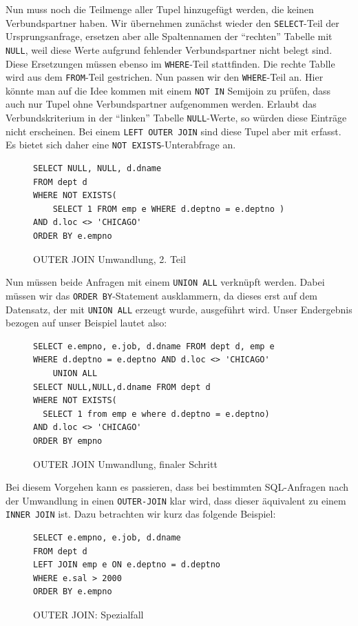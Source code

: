 Nun muss noch die Teilmenge aller Tupel hinzugefügt werden, die keinen Verbundspartner haben. Wir übernehmen zunächst wieder den \verb|SELECT|-Teil der Ursprungsanfrage, ersetzen aber alle Spaltennamen der ``rechten'' Tabelle mit \verb|NULL|, weil diese Werte aufgrund fehlender Verbundspartner nicht belegt sind. Diese Ersetzungen müssen ebenso im \verb|WHERE|-Teil stattfinden. Die rechte Tablle wird aus dem \verb|FROM|-Teil gestrichen. Nun passen wir den \verb|WHERE|-Teil an. Hier könnte man auf die Idee kommen mit einem \verb|NOT IN| Semijoin zu prüfen, dass auch nur Tupel ohne Verbundspartner aufgenommen werden. Erlaubt  das Verbundskriterium in der ``linken'' Tabelle \verb|NULL|-Werte, so würden diese Einträge nicht erscheinen. Bei einem \verb|LEFT OUTER JOIN| sind diese Tupel aber mit erfasst. Es bietet sich daher eine \verb|NOT EXISTS|-Unterabfrage an. 

\begin{figure}[h]
\begin{verbatim}
SELECT NULL, NULL, d.dname
FROM dept d 
WHERE NOT EXISTS(
    SELECT 1 FROM emp e WHERE d.deptno = e.deptno )
AND d.loc <> 'CHICAGO'
ORDER BY e.empno
\end{verbatim}
\caption{OUTER JOIN Umwandlung, 2. Teil}
\end{figure}

Nun müssen beide Anfragen mit einem \verb|UNION ALL| verknüpft werden. Dabei müssen wir das \verb|ORDER BY|-Statement ausklammern, da dieses erst auf dem Datensatz, der mit \verb|UNION ALL| erzeugt wurde, ausgeführt wird. Unser Endergebnis bezogen auf unser Beispiel lautet also:

\begin{figure}[h]
\begin{verbatim}
SELECT e.empno, e.job, d.dname FROM dept d, emp e
WHERE d.deptno = e.deptno AND d.loc <> 'CHICAGO'
    UNION ALL
SELECT NULL,NULL,d.dname FROM dept d 
WHERE NOT EXISTS(
  SELECT 1 from emp e where d.deptno = e.deptno)
AND d.loc <> 'CHICAGO'
ORDER BY empno
\end{verbatim}
\caption{OUTER JOIN Umwandlung, finaler Schritt}
\end{figure}

Bei diesem Vorgehen kann es passieren, dass bei bestimmten SQL-Anfragen nach der Umwandlung in einen \verb|OUTER-JOIN| klar wird, dass dieser äquivalent zu einem \verb|INNER JOIN| ist. Dazu betrachten wir kurz das folgende Beispiel:

\begin{figure}[h]
\begin{verbatim}
SELECT e.empno, e.job, d.dname 
FROM dept d 
LEFT JOIN emp e ON e.deptno = d.deptno 
WHERE e.sal > 2000
ORDER BY e.empno
\end{verbatim}
\caption{OUTER JOIN: Spezialfall}
\end{figure}


